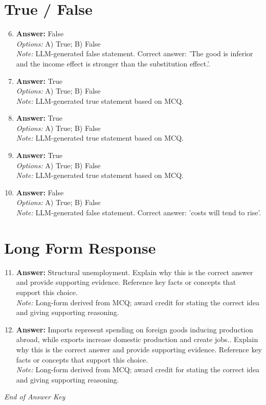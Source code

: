 \documentclass[12pt]{article}
\begin{document}
\section*{True / False}
\begin{enumerate}[label=\arabic*.]
\setcounter{enumi}{5}
\item \textbf{Answer:} False
\\ \textit{Options:} A) True; B) False
\\ \textit{Note:} LLM-generated false statement. Correct answer: 'The good is inferior and the income effect is stronger than the substitution effect.'.
\item \textbf{Answer:} True
\\ \textit{Options:} A) True; B) False
\\ \textit{Note:} LLM-generated true statement based on MCQ.
\item \textbf{Answer:} True
\\ \textit{Options:} A) True; B) False
\\ \textit{Note:} LLM-generated true statement based on MCQ.
\item \textbf{Answer:} True
\\ \textit{Options:} A) True; B) False
\\ \textit{Note:} LLM-generated true statement based on MCQ.
\item \textbf{Answer:} False
\\ \textit{Options:} A) True; B) False
\\ \textit{Note:} LLM-generated false statement. Correct answer: 'costs will tend to rise'.
\end{enumerate}

\section*{Long Form Response}
\begin{enumerate}[label=\arabic*.]
\setcounter{enumi}{10}
\item \textbf{Answer:} Structural unemployment. Explain why this is the correct answer and provide supporting evidence. Reference key facts or concepts that support this choice.
\\ \textit{Note:} Long-form derived from MCQ; award credit for stating the correct idea and giving supporting reasoning.
\item \textbf{Answer:} Imports represent spending on foreign goods inducing production abroad, while exports increase domestic production and create jobs.. Explain why this is the correct answer and provide supporting evidence. Reference key facts or concepts that support this choice.
\\ \textit{Note:} Long-form derived from MCQ; award credit for stating the correct idea and giving supporting reasoning.
\end{enumerate}

\vfill
\noindent\textit{End of Answer Key}
\end{document}
